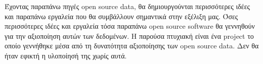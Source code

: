 Έχοντας παραπάνω πηγές open source data, θα δημιουργούνται περισσότερες ιδέες και παραπάνω εργαλεία που θα συμβάλλουν σημαντικά στην εξέλιξη μας. Όσες περισσότερες ιδέες και εργαλεία τόσα παραπάνω open source software θα γεννηθούν για την αξιοποίηση αυτών των δεδομένων. Η παρούσα πτυχιακή είναι ένα project το οποίο γεννήθηκε μέσα από τη δυνατότητα αξιοποίησης των open source data. Δεν θα ήταν εφικτή η υλοποίησή της χωρίς αυτά. 
